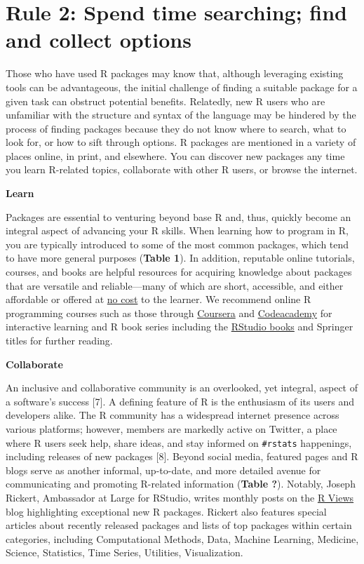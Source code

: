 \documentclass[10pt,letterpaper]{article}
\begin{document}
\hypertarget{rule-2-spend-time-searching-find-and-collect-options}{%
\section{Rule 2: Spend time searching; find and collect
options}\label{rule-2-spend-time-searching-find-and-collect-options}}

Those who have used R packages may know that, although leveraging
existing tools can be advantageous, the initial challenge of finding a
suitable package for a given task can obstruct potential benefits.
Relatedly, new R users who are unfamiliar with the structure and syntax
of the language may be hindered by the process of finding packages
because they do not know where to search, what to look for, or how to
sift through options. R packages are mentioned in a variety of places
online, in print, and elsewhere. You can discover new packages any time
you learn R-related topics, collaborate with other R users, or browse
the internet.

\textbf{Learn}

Packages are essential to venturing beyond base R and, thus, quickly
become an integral aspect of advancing your R skills. When learning how
to program in R, you are typically introduced to some of the most common
packages, which tend to have more general purposes (\textbf{Table 1}).
In addition, reputable online tutorials, courses, and books are helpful
resources for acquiring knowledge about packages that are versatile and
reliable---many of which are short, accessible, and either affordable or
offered at \href{https://committedtotape.shinyapps.io/freeR/}{no cost}
to the learner. We recommend online R programming courses such as those
through \href{https://www.coursera.org/learn/r-programming}{Coursera}
and \href{https://www.codecademy.com/learn/learn-r}{Codeacademy} for
interactive learning and R book series including the
\href{https://rstudio.com/resources/books/}{RStudio books} and Springer
titles for further reading.

\textbf{Collaborate}

An inclusive and collaborative community is an overlooked, yet integral,
aspect of a software's success {[}7{]}. A defining feature of R is the
enthusiasm of its users and developers alike. The R community has a
widespread internet presence across various platforms; however, members
are markedly active on Twitter, a place where R users seek help, share
ideas, and stay informed on \texttt{\#rstats} happenings, including
releases of new packages {[}8{]}. Beyond social media, featured pages
and R blogs serve as another informal, up-to-date, and more detailed
avenue for communicating and promoting R-related information
(\textbf{Table ?}). Notably, Joseph Rickert, Ambassador at Large for
RStudio, writes monthly posts on the
\href{https://rviews.rstudio.com/}{R Views} blog highlighting
exceptional new R packages. Rickert also features special articles about
recently released packages and lists of top packages within certain
categories, including Computational Methods, Data, Machine Learning,
Medicine, Science, Statistics, Time Series, Utilities, Visualization.
\end{document}
